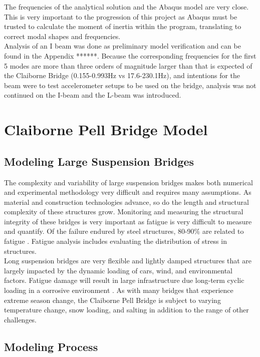 \indent The frequencies of the analytical solution and the Abaqus model are very close. This is very important to the progression of this project as
Abaqus must be trusted to calculate the moment of inertia within the program, translating to correct modal shapes and frequencies. \\
\indent Analysis of an I beam was done as preliminary model verification and can be found in the Appendix ******. Because the corresponding frequencies
for the first 5 modes are more than three orders of magnitude larger than that is expected of the Claiborne Bridge (0.155-0.993Hz vs 17.6-230.1Hz), and
intentions for the beam were to test accelerometer setups to be used on the bridge, analysis was not continued on the I-beam and the L-beam was
introduced. 

\section{Claiborne Pell Bridge Model}

\subsection{Modeling Large Suspension Bridges}
The complexity and variability of large suspension bridges makes both numerical and experimental methodology very difficult and requires many assumptions.
As material and construction technologies advance, so do the length and structural complexity of these structures grow. Monitoring and measuring the
structural integrity of these bridges is very important as fatigue is very difficult to measure and quantify. Of the failure endured by steel
structures, 80-90\% are related to fatigue \cite{Chan}. Fatigue analysis includes evaluating the distribution of stress in structures.\\
\indent Long suspension bridges are very flexible and lightly damped structures that are largely impacted by the dynamic loading of cars, wind, and
environmental factors. Fatigue damage will result in large infrastructure due long-term cyclic loading in a corrosive environment
\cite{Chan,Guo,Li:2003}. As with many bridges that experience extreme season change, the Claiborne Pell Bridge is subject to varying temperature change,
snow loading, and salting in addition to the range of other challenges. 


\subsection{Modeling Process}

